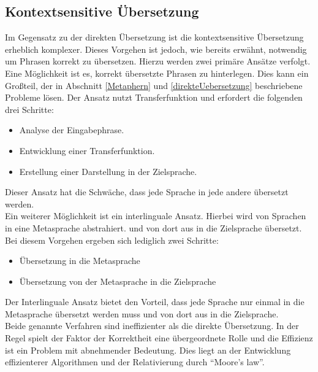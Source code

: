 \documentclass[twoside,a4paper]{article}
\begin{document}
\subsection{Kontextsensitive Übersetzung}
Im Gegensatz zu der direkten Übersetzung ist die kontextsensitive Übersetzung erheblich komplexer. Dieses Vorgehen ist jedoch, wie bereits erwähnt, notwendig um Phrasen korrekt zu übersetzen. Hierzu werden zwei primäre Ansätze verfolgt.\\
Eine Möglichkeit ist es, korrekt übersetzte Phrasen zu hinterlegen. Dies kann ein Großteil, der in Abschnitt \ref{Metaphern} und \ref{direkteUebersetzung} beschriebene Probleme lösen. Der Ansatz nutzt Transferfunktion und erfordert die folgenden drei Schritte:
\begin{itemize}
	\item Analyse der Eingabephrase.
	\item Entwicklung einer Transferfunktion.
	\item Erstellung einer Darstellung in der Zielsprache.
\end{itemize}
Dieser Ansatz hat die Schwäche, dass jede Sprache in jede andere übersetzt werden.\\
Ein weiterer Möglichkeit ist ein interlinguale Ansatz. Hierbei wird von Sprachen in eine Metasprache abstrahiert. und von dort aus in die Zielsprache übersetzt. Bei diesem Vorgehen ergeben sich lediglich zwei Schritte:
\begin{itemize}
	\item Übersetzung in die Metasprache
	\item Übersetzung von der Metasprache in die Zielsprache
\end{itemize}
Der Interlinguale Ansatz bietet den Vorteil, dass jede Sprache nur einmal in die Metasprache übersetzt werden muss und von dort aus in die Zielsprache.\\
Beide genannte Verfahren sind ineffizienter als die direkte Übersetzung. In der Regel spielt der Faktor der Korrektheit eine übergeordnete Rolle und die Effizienz ist ein Problem mit abnehmender Bedeutung. Dies liegt an der Entwicklung effizienterer Algorithmen und der Relativierung durch \enquote{Moore's law}\cite{mooreslaw}.
\end{document}
